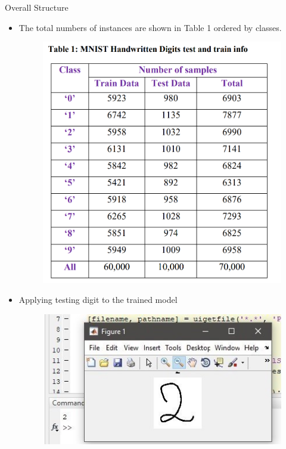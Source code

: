 \documentclass[8pt,final,hyperref={pdfpagelabels=false}]{beamer}
\theoremstyle{plain}
\begin{document}
\begin{frame}
\begin{columns}[t]
\begin{column}{.23\textwidth}
\begin{block}{Overall Structure}
\begin{itemize}
            \item The total numbers of instances are shown in Table 1 ordered by classes.
            
            \begin{figure}
                \includegraphics[width=.8\linewidth]{figures/test train info.png}
            \end{figure}
            
            \item Applying testing digit to the trained model  
            \vspace{\baselineskip}
            
            \begin{figure}
                \includegraphics[width=.8\linewidth]{figures/resultfinal.jpeg}
            \end{figure}
        
        \end{itemize}
    \end{block}
    

\end{column}
\end{columns}
\end{frame}
\end{document}
